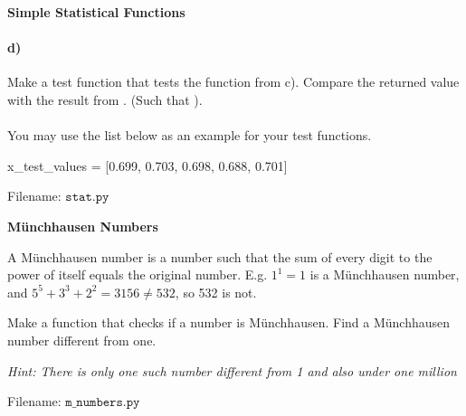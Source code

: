 \begin{Problem}{\textbf{Simple Statistical Functions}}
\paragraph{d)} Make a test function  that tests the function from c). Compare the returned value with the result from
. (Such that ).

\paragraph{} You may use the list below as an example for your test functions.
\begin{python}
x_test_values = [0.699, 0.703, 0.698, 0.688, 0.701]
\end{python}

Filename: $\texttt{stat.py}$
\end{Problem}

\begin{Problem}{\textbf{Münchhausen Numbers}}

\noindent A Münchhausen number is a number such that the sum of every digit to the power
of itself equals the original number. E.g. $1^1 = 1$ is a Münchhausen number, and
 $5^5 + 3^3 + 2^2 = 3156\neq 532$, so 532 is not.

Make a function that checks if a number is Münchhausen. Find a Münchhausen number different from one.

\emph{Hint: There is only one such number different from 1 and also under one million}

Filename: $\texttt{m\_numbers.py}$
\end{Problem}
